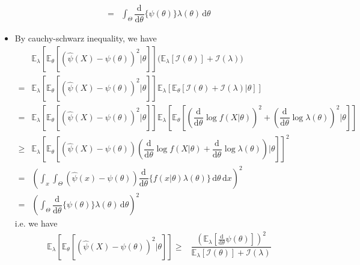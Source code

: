 \documentclass[11pt,a4paper]{ctexart}
\numberwithin{equation}{section}%
\begin{document}
\begin{itemize}[topsep=2pt,itemsep=0pt]
\begin{align*}
        =&\int_\Theta  \dfrac{\mathrm{d}^{}  }{\mathrm{d} \theta ^{} }\{\psi(\theta )\}\lambda (\theta ) \,\mathrm{d}\theta
    \end{align*}
    \item By cauchy-schwarz inequality, we have
    \begin{align*}
        &\mathbb{E}_\lambda \left[ \mathbb{E}_\theta \left[ (\hat{\psi}(X)-\psi(\theta ))^2 |\theta  \right]  \right] \big(\mathbb{E}_\lambda \left[ \mathcal{I}(\theta ) \right] + \mathcal{I}(\lambda ) \big) \\
        =& \mathbb{E}_\lambda \left[ \mathbb{E}_\theta \left[ (\hat{\psi}(X)-\psi(\theta ))^2 |\theta  \right]  \right]\mathbb{E}_\lambda \left[ \mathbb{E}_\theta \left[ \mathcal{I}(\theta ) + \mathcal{I}(\lambda )|\theta  \right]  \right] \\
        =&\mathbb{E}_\lambda \left[ \mathbb{E}_\theta \left[ (\hat{\psi}(X)-\psi(\theta ))^2 |\theta  \right]  \right] \mathbb{E}_\lambda \left[ \mathbb{E}_\theta \left[ \left(\dfrac{\mathrm{d}^{}  }{\mathrm{d} \theta ^{} }\log f(X|\theta)\right)^2 + \left(\dfrac{\mathrm{d}^{}  }{\mathrm{d} \theta ^{} }\log \lambda (\theta )\right)^2|\theta  \right]  \right] \\
        \geq & \mathbb{E}_\lambda \left[ \mathbb{E}_\theta \left[ (\hat{\psi}(X)-\psi(\theta ))\left( \dfrac{\mathrm{d}^{}  }{\mathrm{d} \theta ^{} }\log f(X|\theta) + \dfrac{\mathrm{d}^{}  }{\mathrm{d} \theta ^{} }\log \lambda (\theta ) \right) |\theta  \right]  \right]^2\\
        =& \left(\int_x  \int_\Theta  (\hat{\psi}(x)-\psi(\theta ))\dfrac{\mathrm{d}^{}  }{\mathrm{d} \theta ^{} }\{f(x|\theta )\lambda (\theta )\} \,\mathrm{d}\theta \,\mathrm{d}x\right)^2\\
        =& \left(\int_\Theta  \dfrac{\mathrm{d}^{}  }{\mathrm{d} \theta ^{} }\{\psi(\theta )\}\lambda (\theta ) \,\mathrm{d}\theta\right)^2
    \end{align*}
    i.e. we have
    \begin{align*}
        \mathbb{E}_\lambda \left[ \mathbb{E}_\theta \left[ (\hat{\psi}(X)-\psi(\theta ))^2 |\theta  \right]  \right] \geq& \dfrac{ (\mathbb{E}_\lambda \left[ \frac{\mathrm{d}^{}  }{\mathrm{d}\theta  ^{} }\psi(\theta ) \right] )^2 }{ \mathbb{E}_\lambda \left[ \mathcal{I}(\theta ) \right] + \mathcal{I}(\lambda ) } 
    \end{align*}

    
\end{itemize}
\end{document}
